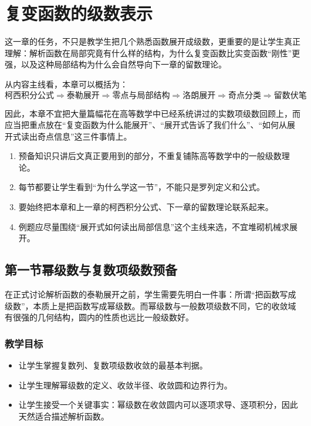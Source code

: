 
\chapter{复变函数的级数表示}

\begin{wulibj}[本章定位]
这一章的任务，不只是教学生把几个熟悉函数展开成级数，更重要的是让学生真正理解：解析函数在局部究竟有什么样的结构，为什么复变函数比实变函数``刚性''更强，以及这种局部结构为什么会自然导向下一章的留数理论。

从内容主线看，本章可以概括为：
\[
    \text{柯西积分公式} \Longrightarrow \text{泰勒展开} \Longrightarrow \text{零点与局部结构} \Longrightarrow \text{洛朗展开} \Longrightarrow \text{奇点分类} \Longrightarrow \text{留数伏笔}
\]

因此，本章不宜把大量篇幅花在高等数学中已经系统讲过的实数项级数回顾上，而应当把重点放在``复变函数为什么能展开''、``展开式告诉了我们什么''、``如何从展开式读出奇点信息''这三件事情上。
\end{wulibj}

\begin{tishi}[写作总原则]
\begin{enumerate}
    \item 预备知识只讲后文真正要用到的部分，不重复铺陈高等数学中的一般级数理论。
    \item 每节都要让学生看到``为什么学这一节''，不能只是罗列定义和公式。
    \item 要始终把本章和上一章的柯西积分公式、下一章的留数理论联系起来。
    \item 例题应尽量围绕``展开式如何读出局部信息''这个主线来选，不宜堆砌机械求展开。
\end{enumerate}
\end{tishi}

\section{第一节\quad 幂级数与复数项级数预备}

\begin{wulibj}[本节要解决的问题]
在正式讨论解析函数的泰勒展开之前，学生需要先明白一件事：所谓``把函数写成级数''，本质上是把函数写成幂级数。而幂级数与一般数项级数不同，它的收敛域有很强的几何结构，圆内的性质也远比一般级数好。
\end{wulibj}

\subsection*{教学目标}
\begin{itemize}
    \item 让学生掌握复数列、复数项级数收敛的最基本判据。
    \item 让学生理解幂级数的定义、收敛半径、收敛圆和边界行为。
    \item 让学生接受一个关键事实：幂级数在收敛圆内可以逐项求导、逐项积分，因此天然适合描述解析函数。
\end{itemize}

